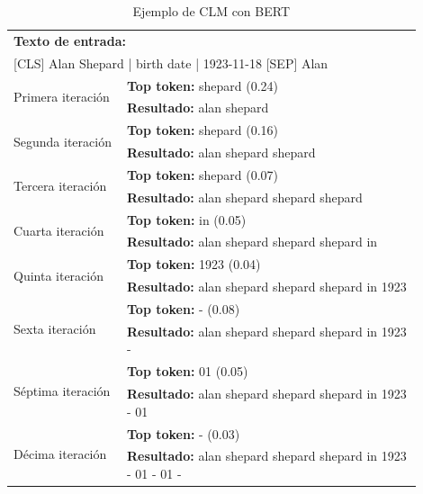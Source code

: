\begin{table}[h!]
    \begin{center}
    \begin{tabular}{p{0.25\linewidth} | p{0.65\linewidth}}
    \multicolumn{2}{p{0.9\linewidth}}{\textbf{Texto de entrada:}} \\ 
    \multicolumn{2}{p{0.9\linewidth}}{[CLS] Alan Shepard | birth date | 1923-11-18 [SEP] Alan} \\ \hline

    \multirow{2}{*}{Primera iteración} 
    &\textbf{Top token:} shepard (0.24) \\ 
    &\textbf{Resultado:} alan shepard \\ \hline
    
    \multirow{2}{*}{Segunda iteración} 
    &\textbf{Top token:} shepard (0.16) \\ 
    &\textbf{Resultado:} alan shepard shepard\\ \hline
    
    \multirow{2}{*}{Tercera iteración} 
    &\textbf{Top token:} shepard (0.07) \\ 
    &\textbf{Resultado:} alan shepard shepard shepard\\ \hline
    
    \multirow{2}{*}{Cuarta iteración} 
    &\textbf{Top token:} in (0.05) \\ 
    &\textbf{Resultado:} alan shepard shepard shepard in\\ \hline
    
    \multirow{2}{*}{Quinta iteración} 
    &\textbf{Top token:} 1923 (0.04) \\ 
    &\textbf{Resultado:} alan shepard shepard shepard in 1923 \\ \hline
    
    \multirow{2}{*}{Sexta iteración} 
    &\textbf{Top token:} - (0.08) \\ 
    &\textbf{Resultado:} alan shepard shepard shepard in 1923 - \\ \hline
    
    \multirow{2}{*}{Séptima iteración} 
    &\textbf{Top token:} 01 (0.05) \\ 
    &\textbf{Resultado:} alan shepard shepard shepard in 1923 - 01\\ \hline
    
    \multirow{2}{*}{Décima iteración} 
    &\textbf{Top token:} - (0.03) \\ 
    &\textbf{Resultado:} alan shepard shepard shepard in 1923 - 01 - 01 -\\ \hline

    
    \end{tabular}
    \caption{Ejemplo de CLM con BERT}
    \label{tab:webnlg_bert_resultados_CLM}
    \end{center}
\end{table}

